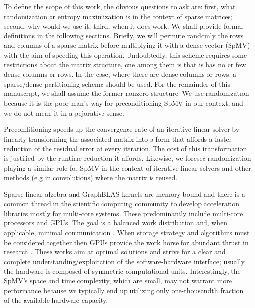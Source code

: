 \documentclass[manuscript,screen]{acmart}
\begin{document}
To define the scope of this work, the obvious questions to ask are:
first, what randomization or entropy maximization is in the context of
sparse matrices; second, why would we use it; third, when it does
work.  We shall provide formal definitions in the following
sections. Briefly, we will permute randomly the rows and columns of a
sparse matrix before multiplying it with a dense vector (SpMV) with
the aim of speeding this operation.  Undoubtedly, this scheme requires
some restrictions about the matrix structure, one among them is that
is has no or few dense columns or rows.  In the case, where there are
dense columns or rows, a sparse/dense partitioning scheme should be
used. For the remainder of this manuscript, we shall assume the former
nonzero structure. We use randomization because it is the poor man's
way for preconditioning SpMV in our context, and we do not mean it in
a pejorative sense.


Preconditioning speeds up the convergence rate of an iterative linear
solver by linearly transforming the associated matrix into a form that
affords a faster reduction of the residual error at every iteration.
The cost of this transformation is justified by the runtime reduction
it affords.  Likewise, we foresee randomization playing a similar role
for SpMV in the context of iterative linear solvers and other methods
(e.g in convolutions) where the matrix is reused.

Sparse linear algebra and GraphBLAS kernels are memory bound and there
is a common thread in the scientific computing community to develop
acceleration libraries mostly for multi-core systems. These
predominantly include multi-core processors and GPUs. The goal is
a balanced work distribution and, when applicable, minimal
communication
\cite{DBLP:journals/siamsc/KayaaslanAU18,DBLP:conf/ieeehpcs/PageK18}. When
storage strategy and algorithms must be considered together then GPUs
provide the work horse for abundant thrust in research
\cite{DBLP:journals/topc/AnztCYDFNTTW20}. These works aim at optimal
solutions and strive for a clear and complete
understanding/exploitation of the software-hardware interface; usually
the hardware is composed of symmetric computational
units. Interestingly, the SpMV's space and time complexity, which are
small, may not warrant more performance because we typically end up
utilizing only one-thousandth fraction of the available hardware
capacity.
\end{document}
